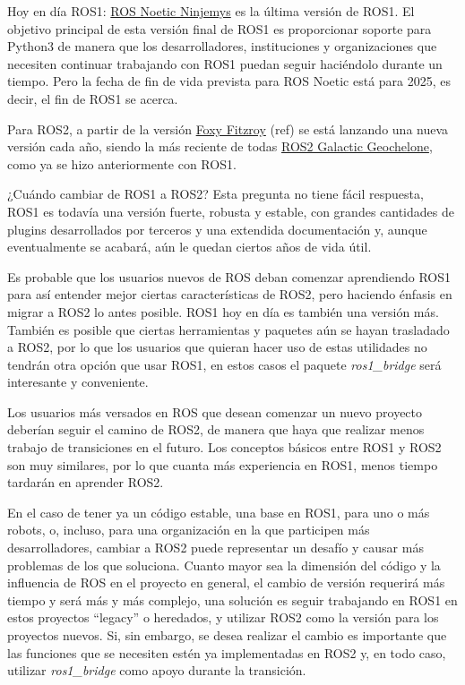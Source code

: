 Hoy en día ROS1: \href{http://wiki.ros.org/noetic}{ROS Noetic Ninjemys} es la última versión de ROS1. El objetivo principal de esta versión final de ROS1 es proporcionar soporte para Python3 de manera que los desarrolladores, instituciones y organizaciones que necesiten continuar trabajando con ROS1 puedan seguir haciéndolo durante un tiempo. Pero la fecha de fin de vida prevista para ROS Noetic está para 2025, es decir, el fin de ROS1 se acerca.

Para ROS2, a partir de la versión \href{https://docs.ros.org/en/foxy/Releases/Release-Foxy-Fitzroy.html}{Foxy Fitzroy} (ref) se está lanzando una nueva versión cada año, siendo la más reciente de todas \href{https://docs.ros.org/en/foxy/Releases/Release-Galactic-Geochelone.html}{ROS2 Galactic Geochelone}, como ya se hizo anteriormente con ROS1.

¿Cuándo cambiar de ROS1 a ROS2? Esta pregunta no tiene fácil respuesta, ROS1 es todavía una versión fuerte, robusta y estable, con grandes cantidades de plugins desarrollados por terceros y una extendida documentación y, aunque eventualmente se acabará, aún le quedan ciertos años de vida útil.

Es probable que los usuarios nuevos de ROS deban comenzar aprendiendo ROS1 para así entender mejor ciertas características de ROS2, pero haciendo énfasis en migrar a ROS2 lo antes posible. ROS1 hoy en día es también una versión más. También es posible que ciertas herramientas y paquetes aún se hayan trasladado a ROS2, por lo que los usuarios que quieran hacer uso de estas utilidades no tendrán otra opción que usar ROS1, en estos casos el paquete \textit{ros1\_bridge} será interesante y conveniente.

Los usuarios más versados en ROS que desean comenzar un nuevo proyecto deberían seguir el camino de ROS2, de manera que haya que realizar menos trabajo de transiciones en el futuro. Los conceptos básicos entre ROS1 y ROS2 son muy similares, por lo que cuanta más experiencia en ROS1, menos tiempo tardarán en aprender ROS2.

En el caso de tener ya un código estable, una base en ROS1, para uno o más robots, o, incluso, para una organización en la que participen más desarrolladores, cambiar a ROS2 puede representar un desafío y causar más problemas de los que soluciona. Cuanto mayor sea la dimensión del código y la influencia de ROS en el proyecto en general, el cambio de versión requerirá más tiempo y será más y más complejo, una solución es seguir trabajando en ROS1 en estos proyectos ``legacy'' o heredados, y utilizar ROS2 como la versión para los proyectos nuevos. Si, sin embargo, se desea realizar el cambio es importante que las funciones que se necesiten estén ya implementadas en ROS2 y, en todo caso, utilizar \textit{ros1\_bridge} como apoyo durante la transición.

